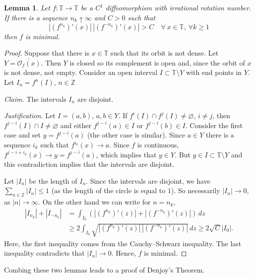 \documentclass[12pt]{article}
\newtheorem{lemma}[theorem]{Lemma}
\theoremstyle{definition}
\theoremstyle{remark}
\begin{document}
\begin{lemma} \label{lemma_for_denjoy2}
Let $f : \mathbb T \to \mathbb T$ be a $C^1$ diffeomorphism with irrational rotation number.
If there is a sequence $n_k \uparrow \infty$ and $C>0$ such that
\[
|(f^{n_k})'(x)| \, |(f^{-n_k})'(x)| > C \quad
\forall\ x \in \mathbb T, \ \forall k \ge 1
\]
then $f$ is minimal.
\end{lemma}

\begin{proof}
Suppose that there is $x \in \mathbb T$ such that its orbit is not dense.
Let $Y = \overline{\mathcal O_f(x)}$. Then $Y$ is closed so its complement is open and, 
since the orbit of $x$ is not dense,
not empty. Consider an open interval $I  \subset \mathbb T \setminus Y$ with end points in $Y$. Let
$I_n = f^n(I)$, $n \in \mathbb Z$

\smallskip
\noindent
{\it Claim.}
The intervals $I_n$ are disjoint.

\smallskip
\noindent
{\it Justification.}
Let $I = (a, b)$, $a, b \in Y$. If $f^i(I) \cap f^j(I) \ne \varnothing$, $i \ne j$, then 
$f^{j-i}(I) \cap I \ne \varnothing$ and either $f^{j-i}(a) \in I$ 
or $f^{j-i}(b) \in I$. Consider the first case and set $y = f^{j-i}(a)$ (the
other case is similar). Since $a \in Y$ there is a sequence $i_k$ such that $f^{i_k} (x) \to a$. Since
$f$ is continuous, $f^{j-i+i_k} (x) \to y = f^{j-i}(a)$, which implies that $y \in  Y$. But $y \in I \subset \mathbb T 
\setminus Y$ and this
contradiction implies that the intervals are disjoint.

\smallskip
Let $|I_n|$ be the length of $I_n$. Since
the intervals are disjoint, we have
$\sum_{n\in \mathbb Z} |I_n| \le 1$ (as the length of the circle is equal to
$1$). So necessarily $|I_n| \to 0$, as $|n| \to \infty$.
On the other hand we can write for $n = n_k$,
\begin{align*}
|I_{n_k}| + |I_{-n_k}| 
&= \int_{I_0} \left(|(f^{n_k})'(z)| + |(f^{-n_k})'(z)|\right) \, dz \\
&\ge 
2 \int_{I_0} \sqrt{|(f^{n_k})'(z)| \, |(f^{-n_k})'(z)|} \, dz
\ge 2 \sqrt{C} |I_0|.
\end{align*}
Here, the first inequality comes from the Cauchy--Schwarz inequality.
The last inequality contradicts that $|I_n| \to 0$. Hence, $f$ is minimal.
\end{proof}

Combing these two lemmas leads to a proof of Denjoy's Theorem.
\end{document}
